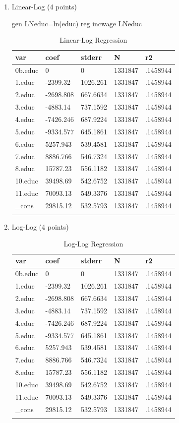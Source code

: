 \documentclass{article}
\begin{document}
\begin{enumerate}[label=\alph*]
\begin{table}[tbp]
\begin{tabularx}{\textwidth}{lCCCC}
	\end{tabularx}
\end{table}




\item Linear-Log (4 points)

gen LNeduc=ln(educ)
reg incwage LNeduc


\begin{table}[tbp] \centering
	
	\caption{Linear-Log Regression}
	\begin{tabularx}{\textwidth}{lCCCC}
		
		\toprule
		{var}&{coef}&{stderr}&{N}&{r2} \tabularnewline
		\midrule\addlinespace[1.5ex]
		0b.educ&0&0&1331847&.1458944 \tabularnewline
		1.educ&-2399.32&1026.261&1331847&.1458944 \tabularnewline
		2.educ&-2698.808&667.6634&1331847&.1458944 \tabularnewline
		3.educ&-4883.14&737.1592&1331847&.1458944 \tabularnewline
		4.educ&-7426.246&687.9224&1331847&.1458944 \tabularnewline
		5.educ&-9334.577&645.1861&1331847&.1458944 \tabularnewline
		6.educ&5257.943&539.4581&1331847&.1458944 \tabularnewline
		7.educ&8886.766&546.7324&1331847&.1458944 \tabularnewline
		8.educ&15787.23&556.1182&1331847&.1458944 \tabularnewline
		10.educ&39498.69&542.6752&1331847&.1458944 \tabularnewline
		11.educ&70093.13&549.3376&1331847&.1458944 \tabularnewline
		\_cons&29815.12&532.5793&1331847&.1458944 \tabularnewline
		\bottomrule \addlinespace[1.5ex]
		
	\end{tabularx}
\end{table}



\item Log-Log (4 points)


\begin{table}[tbp] \centering
	
	\caption{Log-Log Regression}
	\begin{tabularx}{\textwidth}{lCCCC}
		
		\toprule
		{var}&{coef}&{stderr}&{N}&{r2} \tabularnewline
		\midrule\addlinespace[1.5ex]
		0b.educ&0&0&1331847&.1458944 \tabularnewline
		1.educ&-2399.32&1026.261&1331847&.1458944 \tabularnewline
		2.educ&-2698.808&667.6634&1331847&.1458944 \tabularnewline
		3.educ&-4883.14&737.1592&1331847&.1458944 \tabularnewline
		4.educ&-7426.246&687.9224&1331847&.1458944 \tabularnewline
		5.educ&-9334.577&645.1861&1331847&.1458944 \tabularnewline
		6.educ&5257.943&539.4581&1331847&.1458944 \tabularnewline
		7.educ&8886.766&546.7324&1331847&.1458944 \tabularnewline
		8.educ&15787.23&556.1182&1331847&.1458944 \tabularnewline
		10.educ&39498.69&542.6752&1331847&.1458944 \tabularnewline
		11.educ&70093.13&549.3376&1331847&.1458944 \tabularnewline
		\_cons&29815.12&532.5793&1331847&.1458944 \tabularnewline
		\bottomrule \addlinespace[1.5ex]
		

\end{tabularx}
\end{table}
\end{enumerate}
\end{document}
